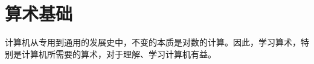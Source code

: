 \chapter{算术基础}\label{ch:MathBasics}
    计算机从专用到通用的发展史中，不变的本质是对数的计算。因此，学习算术，特别是计算机所需要的算术，对于理解、学习计算机有益。
